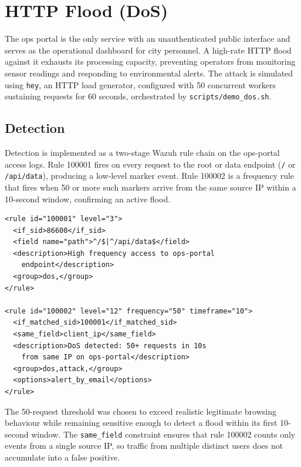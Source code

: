 \section{HTTP Flood (DoS)}
\label{sec:threat-dos}

The ops portal is the only service with an unauthenticated public interface and
serves as the operational dashboard for city personnel. A high-rate HTTP flood
against it exhausts its processing capacity, preventing operators from monitoring
sensor readings and responding to environmental alerts. The attack is simulated
using \texttt{hey}, an HTTP load generator, configured with 50 concurrent workers
sustaining requests for 60 seconds, orchestrated by \texttt{scripts/demo\_dos.sh}.

\subsection{Detection}

Detection is implemented as a two-stage Wazuh rule chain on the ops-portal
access logs. Rule 100001 fires on every request to the root or data endpoint
(\texttt{/} or \texttt{/api/data}), producing a low-level marker event. Rule
100002 is a frequency rule that fires when 50 or more such markers arrive from
the same source IP within a 10-second window, confirming an active flood.

\begin{lstlisting}[style=xmlstyle, caption={Wazuh rules for HTTP flood detection.}]
<rule id="100001" level="3">
  <if_sid>86600</if_sid>
  <field name="path">^/$|^/api/data$</field>
  <description>High frequency access to ops-portal
    endpoint</description>
  <group>dos,</group>
</rule>

<rule id="100002" level="12" frequency="50" timeframe="10">
  <if_matched_sid>100001</if_matched_sid>
  <same_field>client_ip</same_field>
  <description>DoS detected: 50+ requests in 10s
    from same IP on ops-portal</description>
  <group>dos,attack,</group>
  <options>alert_by_email</options>
</rule>
\end{lstlisting}

The 50-request threshold was chosen to exceed realistic legitimate browsing
behaviour while remaining sensitive enough to detect a flood within its first
10-second window. The \texttt{same\_field} constraint ensures that rule 100002
counts only events from a single source IP, so traffic from multiple distinct
users does not accumulate into a false positive.

